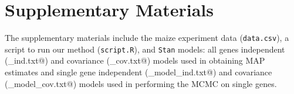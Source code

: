 \documentclass[useAMS,usenatbib,referee]{biom}
\begin{document}

\section*{Supplementary Materials}

The supplementary materials include the maize experiment data ({\tt data.csv}), a script to run our method ({\tt script.R}), and {\tt Stan} models: all genes independent (\verb@model_ind.txt@) and covariance (\verb@model_cov.txt@) models used in obtaining MAP estimates and single gene independent (\verb@sg_model_ind.txt@) and covariance (\verb@sg_model_cov.txt@) models used in performing the MCMC on single genes. 





\label{lastpage}
\end{document}
